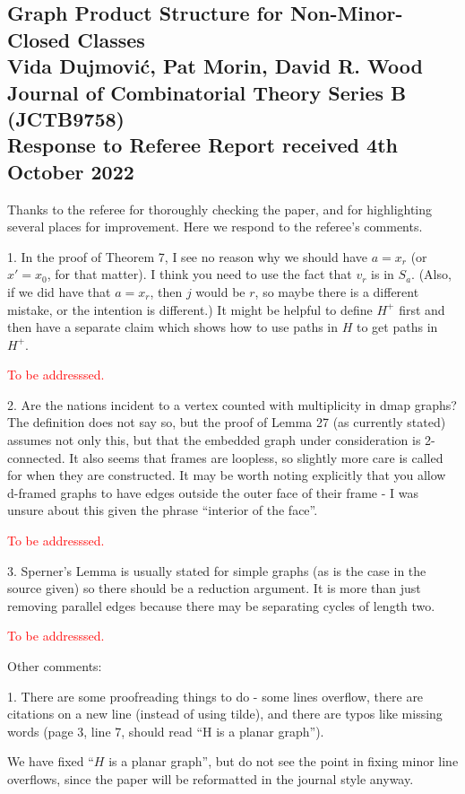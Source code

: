 \documentclass[12pt]{article}
\newcommand{\tba}{\textcolor{red}{To be addresssed.}}
\newenvironment{response}{\color{blue}}{}
\begin{document}
\subsection*{Graph Product Structure for Non-Minor-Closed Classes\\
Vida Dujmovi\'c, Pat Morin, David R. Wood\\
Journal of Combinatorial Theory Series B (JCTB9758)\\
Response to Referee Report received 4th October 2022}

Thanks to the referee for thoroughly checking the paper, and for highlighting several places for improvement. Here we respond to the referee's comments.

\hrulefill

1. In the proof of Theorem 7, I see no reason why we should have $a = x_r$
(or $x'=x_0$, for that matter). I think you need to use the fact that $v_r$ is
in $S_a$. (Also, if we did have that $a = x_r$, then $j$ would be $r$, so maybe
there is a different mistake, or the intention is different.) It might be
helpful to define $H^+$ first and then have a separate claim which shows
how to use paths in $H$ to get paths in $H^+$.

\tba

2. Are the nations incident to a vertex counted with multiplicity in dmap graphs? The definition does not say so, but the proof of Lemma 27 (as currently stated) assumes not only this, but that the embedded graph under consideration is 2-connected. It also seems that frames are loopless, so slightly more care is called for when they are constructed.
It may be worth noting explicitly that you allow d-framed graphs to
have edges outside the outer face of their frame - I was unsure about
this given the phrase “interior of the face”.

\tba

3. Sperner’s Lemma is usually stated for simple graphs (as is the case
in the source given) so there should be a reduction argument. It is
more than just removing parallel edges because there may be separating
cycles of length two.

\tba

Other comments:

1. There are some proofreading things to do - some lines overflow, there
are citations on a new line (instead of using tilde), and there are typos
like missing words (page 3, line 7, should read “H is a planar graph”).

\begin{response}
	We have fixed ``$H$ is a planar graph'', but do not see the point in fixing minor line overflows, since the paper will be reformatted in the journal style anyway.
\end{response}
\end{document}
